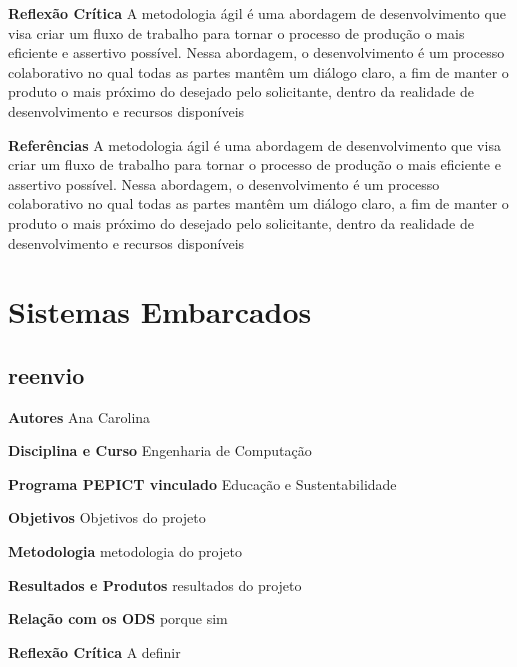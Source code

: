 \documentclass[12pt,openright,oneside,a4paper]{report}
\begin{document}
\vspace{0.7cm}
\noindent
\textbf{Reflexão Crítica}
A metodologia ágil é uma abordagem de desenvolvimento que visa criar um fluxo de trabalho para tornar o processo de produção o mais eficiente e assertivo possível. Nessa abordagem, o desenvolvimento é um processo colaborativo no qual todas as partes mantêm um diálogo claro, a fim de manter o produto o mais próximo do desejado pelo solicitante, dentro da realidade de desenvolvimento e recursos disponíveis

\vspace{0.7cm}
\noindent
\textbf{Referências}
A metodologia ágil é uma abordagem de desenvolvimento que visa criar um fluxo de trabalho para tornar o processo de produção o mais eficiente e assertivo possível. Nessa abordagem, o desenvolvimento é um processo colaborativo no qual todas as partes mantêm um diálogo claro, a fim de manter o produto o mais próximo do desejado pelo solicitante, dentro da realidade de desenvolvimento e recursos disponíveis

\vspace{0.7cm}
\chapter{Sistemas Embarcados}

\section{reenvio}
\noindent
\textbf{Autores}
Ana Carolina

\vspace{0.7cm}
\noindent
\textbf{Disciplina e Curso}
Engenharia de Computação

\vspace{0.7cm}
\noindent
\textbf{Programa PEPICT vinculado}
Educação e Sustentabilidade

\vspace{0.7cm}
\noindent
\textbf{Objetivos}
Objetivos do projeto

\vspace{0.7cm}
\noindent
\textbf{Metodologia}
metodologia do projeto

\vspace{0.7cm}
\noindent
\textbf{Resultados e Produtos}
resultados do projeto

\vspace{0.7cm}
\noindent
\textbf{Relação com os ODS}
porque sim

\vspace{0.7cm}
\noindent
\textbf{Reflexão Crítica}
A definir
\end{document}
